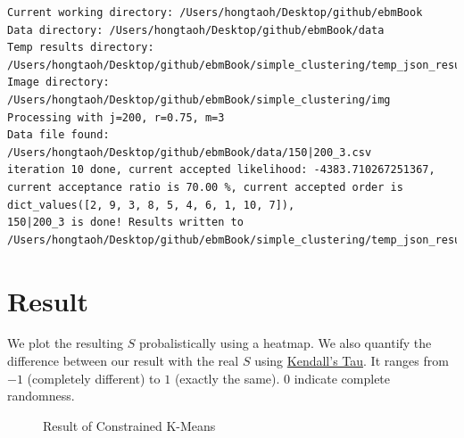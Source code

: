 \documentclass[
  letterpaper,
  DIV=11,
  numbers=noendperiod]{scrreprt}
\begin{document}
\begin{verbatim}
Current working directory: /Users/hongtaoh/Desktop/github/ebmBook
Data directory: /Users/hongtaoh/Desktop/github/ebmBook/data
Temp results directory: /Users/hongtaoh/Desktop/github/ebmBook/simple_clustering/temp_json_results
Image directory: /Users/hongtaoh/Desktop/github/ebmBook/simple_clustering/img
Processing with j=200, r=0.75, m=3
Data file found: /Users/hongtaoh/Desktop/github/ebmBook/data/150|200_3.csv
iteration 10 done, current accepted likelihood: -4383.710267251367, current acceptance ratio is 70.00 %, current accepted order is dict_values([2, 9, 3, 8, 5, 4, 6, 1, 10, 7]), 
150|200_3 is done! Results written to /Users/hongtaoh/Desktop/github/ebmBook/simple_clustering/temp_json_results/temp_results_200_0.75_3.json
\end{verbatim}

\section{Result}\label{result-1}

We plot the resulting \(S\) probalistically using a heatmap. We also
quantify the difference between our result with the real \(S\) using
\href{https://en.wikipedia.org/wiki/Kendall_rank_correlation_coefficient}{Kendall's
Tau}. It ranges from \(-1\) (completely different) to \(1\) (exactly the
same). \(0\) indicate complete randomness.

\begin{figure}


\caption{\label{fig-cop-kmeans-result}Result of Constrained K-Means}

\end{figure}%
\end{document}
